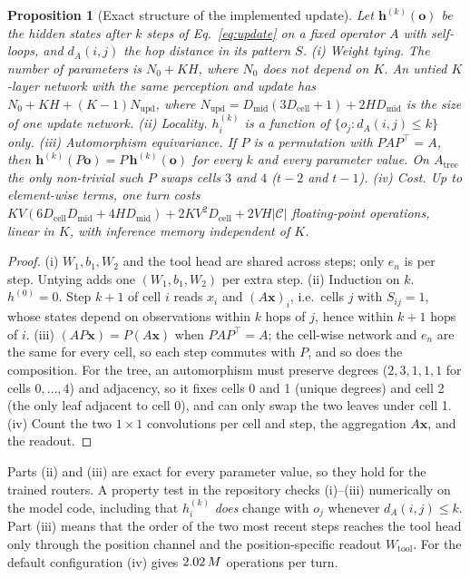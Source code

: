 \documentclass[10pt]{article}
\newtheorem{proposition}{Proposition}
\begin{document}
\begin{proposition}[Exact structure of the implemented update]\label{prop:structure}
Let $\mathbf h^{(k)}(\mathbf o)$ be the hidden states after $k$ steps of Eq.~\eqref{eq:update} on a fixed operator $A$ with self-loops, and $d_A(i,j)$ the hop distance in its pattern $S$.
(i) \emph{Weight tying.} The number of parameters is $N_0 + KH$, where $N_0$ does not depend on $K$. An untied $K$-layer network with the same perception and update has $N_0 + KH + (K{-}1)N_{\text{upd}}$, where $N_{\text{upd}} = D_{\text{mid}}(3D_{\text{cell}}+1) + 2H D_{\text{mid}}$ is the size of one update network.
(ii) \emph{Locality.} $h_i^{(k)}$ is a function of $\{o_j : d_A(i,j)\le k\}$ only.
(iii) \emph{Automorphism equivariance.} If $P$ is a permutation with $PAP^{\top}=A$, then $\mathbf h^{(k)}(P\mathbf o) = P\,\mathbf h^{(k)}(\mathbf o)$ for every $k$ and every parameter value. On $A_{\text{tree}}$ the only non-trivial such $P$ swaps cells $3$ and $4$ ($t{-}2$ and $t{-}1$).
(iv) \emph{Cost.} Up to element-wise terms, one turn costs $K V (6D_{\text{cell}}D_{\text{mid}} + 4HD_{\text{mid}}) + 2KV^2 D_{\text{cell}} + 2VH|\mathcal C|$ floating-point operations, linear in $K$, with inference memory independent of $K$.
\end{proposition}
\begin{proof}
(i) $W_1,b_1,W_2$ and the tool head are shared across steps; only $e_n$ is per step. Untying adds one $(W_1,b_1,W_2)$ per extra step. (ii) Induction on $k$. $h^{(0)}=0$. Step $k{+}1$ of cell $i$ reads $x_i$ and $(A\mathbf x)_i$, i.e.\ cells $j$ with $S_{ij}=1$, whose states depend on observations within $k$ hops of $j$, hence within $k{+}1$ hops of $i$. (iii) $(A P\mathbf x) = P(A\mathbf x)$ when $PAP^{\top}=A$; the cell-wise network and $e_n$ are the same for every cell, so each step commutes with $P$, and so does the composition. For the tree, an automorphism must preserve degrees ($2,3,1,1,1$ for cells $0,\dots,4$) and adjacency, so it fixes cells 0 and 1 (unique degrees) and cell 2 (the only leaf adjacent to cell 0), and can only swap the two leaves under cell 1. (iv) Count the two $1\times1$ convolutions per cell and step, the aggregation $A\mathbf x$, and the readout.
\end{proof}
Parts (ii) and (iii) are exact for every parameter value, so they hold for the trained routers. A property test in the repository checks (i)--(iii) numerically on the model code, including that $h_i^{(k)}$ \emph{does} change with $o_j$ whenever $d_A(i,j)\le k$. Part (iii) means that the order of the two most recent steps reaches the tool head only through the position channel and the position-specific readout $W_{\text{tool}}$. For the default configuration (iv) gives $2.02\,M$ operations per turn.
\end{document}
